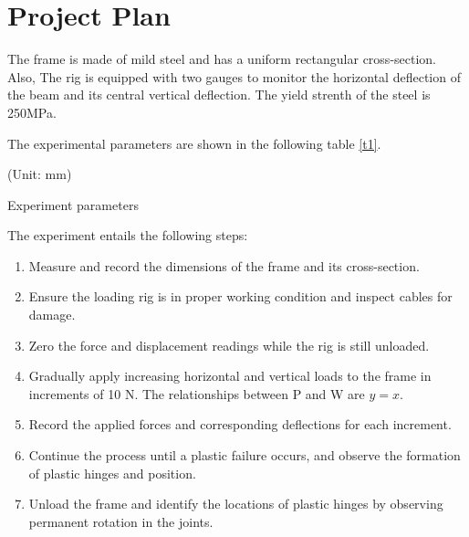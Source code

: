 \section{Project Plan}
\FloatBarrier %



\iffalse
The frame is made of mild steel and has a uniform rectangular cross-section. Also, The rig is equipped with two gauges to monitor the horizontal deflection of the beam and its central vertical deflection. The yield strenth of the steel is 250MPa.

The experimental parameters are shown in the following table \autoref{t1}.

\begin{minipage}[htbp]{\textwidth}
    \makeatletter{}
    \centering

    (Unit: mm)
    \caption{Experiment parameters}
    \label{t1} 
\end{minipage}


The experiment entails the following steps:
\begin{enumerate}
    \item Measure and record the dimensions of the frame and its cross-section.

    \item Ensure the loading rig is in proper working condition and inspect cables for damage.
    
    \item Zero the force and displacement readings while the rig is still unloaded.
    
    \item Gradually apply increasing horizontal and vertical loads to the frame in increments of 10 N. The relationships between P and W are $y=x$\label{ee1}.
    
    \item Record the applied forces and corresponding deflections for each increment.
    
    \item Continue the process until a plastic failure occurs, and observe the formation of plastic hinges and position.
    
    \item Unload the frame and identify the locations of plastic hinges by observing permanent rotation in the joints.
    
\end{enumerate}

